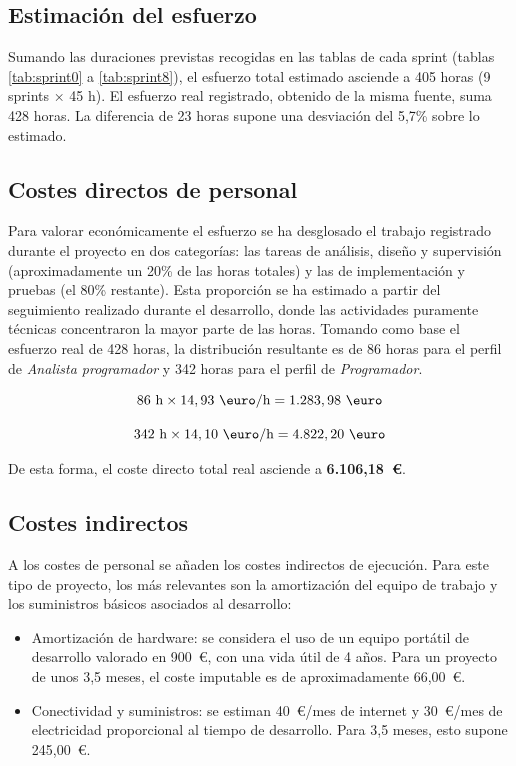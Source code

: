 \subsection{Estimación del esfuerzo}

Sumando las duraciones previstas recogidas en las tablas de cada sprint (tablas \ref{tab:sprint0} a \ref{tab:sprint8}), el esfuerzo total estimado asciende a 405 horas (9 sprints × 45 h). El esfuerzo real registrado, obtenido de la misma fuente, suma 428 horas. La diferencia de 23 horas supone una desviación del 5,7\% sobre lo estimado.


\subsection{Costes directos de personal}

Para valorar económicamente el esfuerzo se ha desglosado el trabajo registrado durante el proyecto en dos categorías: las tareas de análisis, diseño y supervisión (aproximadamente un 20\% de las horas totales) y las de implementación y pruebas (el 80\% restante). Esta proporción se ha estimado a partir del seguimiento realizado durante el desarrollo, donde las actividades puramente técnicas concentraron la mayor parte de las horas. Tomando como base el esfuerzo real de 428 horas, la distribución resultante es de 86 horas para el perfil de \textit{Analista programador} y 342 horas para el perfil de \textit{Programador}.

\[
86\ \text{h} \times 14,93\ \text{\euro/h} = 1.283,98\ \text{\euro}
\]

\[
342\ \text{h} \times 14,10\ \text{\euro/h} = 4.822,20\ \text{\euro}
\]

De esta forma, el coste directo total real asciende a \textbf{6.106,18~\euro}.

\subsection{Costes indirectos}

A los costes de personal se añaden los costes indirectos de ejecución. Para este tipo de proyecto, los más relevantes son la amortización del equipo de trabajo y los suministros básicos asociados al desarrollo:

\begin{itemize}
  \item Amortización de hardware: se considera el uso de un equipo portátil de desarrollo valorado en 900~\euro, con una vida útil de 4 años. Para un proyecto de unos 3,5 meses, el coste imputable es de aproximadamente 66,00~\euro.
  \item Conectividad y suministros: se estiman 40~\euro/mes de internet y 30~\euro/mes de electricidad proporcional al tiempo de desarrollo. Para 3,5 meses, esto supone 245,00~\euro.
\end{itemize}

